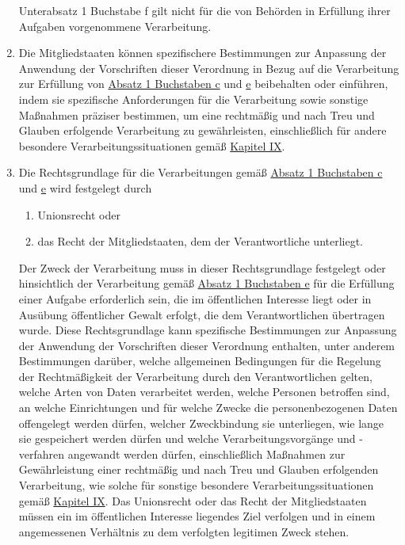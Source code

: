 \begin{enumerate}
\begin{enumerate}
  \end{enumerate}

  Unterabsatz 1 Buchstabe f gilt nicht für die von Behörden in Erfüllung ihrer Aufgaben vorgenommene Verarbeitung.

  \item Die Mitgliedstaaten können spezifischere Bestimmungen zur Anpassung der Anwendung der Vorschriften dieser
   Verordnung in Bezug auf die Verarbeitung zur Erfüllung von \hyperref[itm:06-1c]{Absatz 1 Buchstaben c} und \hyperref
   [itm:06-1e]{e} beibehalten oder einführen, indem sie spezifische Anforderungen für die Verarbeitung sowie sonstige
   Maßnahmen präziser bestimmen, um eine rechtmäßig und nach Treu und Glauben erfolgende Verarbeitung zu gewährleisten,
   einschließlich für andere besondere Verarbeitungssituationen gemäß \hyperref[part:9]{Kapitel IX}.
  \label{itm:06-2}

  \item Die Rechtsgrundlage für die Verarbeitungen gemäß \hyperref[itm:06-1c]{Absatz 1 Buchstaben c} und \hyperref
   [itm:06-1e]{e} wird festgelegt durch
  \label{itm:06-3}

  \begin{enumerate}
  
    \item Unionsrecht oder
    \label{itm:06-3a}

    \item das Recht der Mitgliedstaaten, dem der Verantwortliche unterliegt.
    \label{itm:06-3b}

  \end{enumerate}

  Der Zweck der Verarbeitung muss in dieser Rechtsgrundlage festgelegt oder hinsichtlich der Verarbeitung gemäß
  \hyperref[itm:06-1e]{Absatz 1 Buchstaben e} für die Erfüllung einer Aufgabe erforderlich sein, die im öffentlichen
   Interesse liegt oder in Ausübung öffentlicher Gewalt erfolgt, die dem Verantwortlichen übertragen wurde. Diese
   Rechtsgrundlage kann spezifische Bestimmungen zur Anpassung der Anwendung der Vorschriften dieser Verordnung
   enthalten, unter anderem Bestimmungen darüber, welche allgemeinen Bedingungen für die Regelung der Rechtmäßigkeit
   der Verarbeitung durch den Verantwortlichen gelten, welche Arten von Daten verarbeitet werden, welche Personen
   betroffen sind, an welche Einrichtungen und für welche Zwecke die personenbezogenen Daten offengelegt werden dürfen,
   welcher Zweckbindung sie unterliegen, wie lange sie gespeichert werden dürfen und welche Verarbeitungsvorgänge
   und -verfahren angewandt werden dürfen, einschließlich Maßnahmen zur Gewährleistung einer rechtmäßig und nach Treu
   und Glauben erfolgenden Verarbeitung, wie solche für sonstige besondere Verarbeitungssituationen gemäß \hyperref
   [part:9]{Kapitel IX}. Das Unionsrecht oder das Recht der Mitgliedstaaten müssen ein im öffentlichen Interesse
   liegendes Ziel verfolgen und in einem angemessenen Verhältnis zu dem verfolgten legitimen Zweck stehen.


\end{enumerate}
